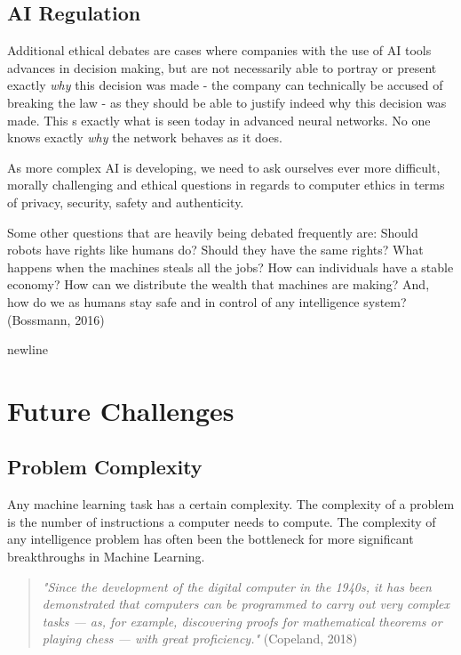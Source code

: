 \documentclass[
a4paper,
11pt,
english
]{report}
\begin{document}
\subsection{AI Regulation}
Additional ethical debates are cases where companies with the use of AI tools advances in decision making, but are not necessarily able to portray or present exactly \textit{why} this decision was made - the company can technically be accused of breaking the law - as they should be able to justify indeed why this decision was made. This s exactly what is seen today in advanced neural networks. No one knows exactly \textit{why} the network behaves as it does.

As more complex AI is developing, we need to ask ourselves ever more difficult, morally challenging and ethical questions in regards to computer ethics in terms of privacy, security, safety and authenticity.

Some other questions that are heavily being debated frequently are: Should robots have rights like humans do? Should they have the same rights? What happens when the machines steals all the jobs? How can individuals have a stable economy? How can we distribute the wealth that machines are making? And, how do we as humans stay safe and in control of any intelligence system? (Bossmann, 2016)

newline

\section{Future Challenges}
\subsection{Problem Complexity}
Any machine learning task has a certain complexity. The complexity of a problem is the number of instructions a computer needs to compute. The complexity of any intelligence problem has often been the bottleneck for more significant breakthroughs in Machine Learning.

\begin{quote}
    \textit{"Since the development of the digital computer in the 1940s, it has been demonstrated that computers can be programmed to carry out very complex tasks — as, for example, discovering proofs for mathematical theorems or playing chess — with great proficiency."} (Copeland, 2018)
\end{quote}
\end{document}
